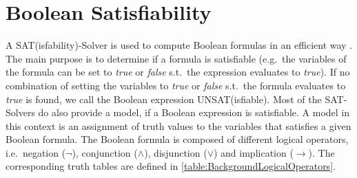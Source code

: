 \section{Boolean Satisfiability}
\label{sec:BooleanSatisfiability}

A SAT(isfability)-Solver is used to compute Boolean formulas in an efficient way \cite{Biere2009}. The main purpose is to determine if a formula is satisfiable (e.g.\ the variables of the formula can be set to \emph{true} or \emph{false} s.t.\ the expression evaluates to \emph{true}). If no combination of setting the variables to \emph{true} or \emph{false} s.t.\ the formula evaluates to \emph{true} is found, we call the Boolean expression UNSAT(isfiable). Most of the SAT-Solvers do also provide a model, if a Boolean expression is satisfiable. A model in this context is an assignment of truth values to the variables that satisfies a given Boolean formula. The Boolean formula is composed of different logical operators, i.e.\ negation ($\lnot$), conjunction ($\land$), disjunction ($\lor$) and implication ($\rightarrow$). The corresponding truth tables are defined in \cref{table:BackgroundLogicalOperators}.

